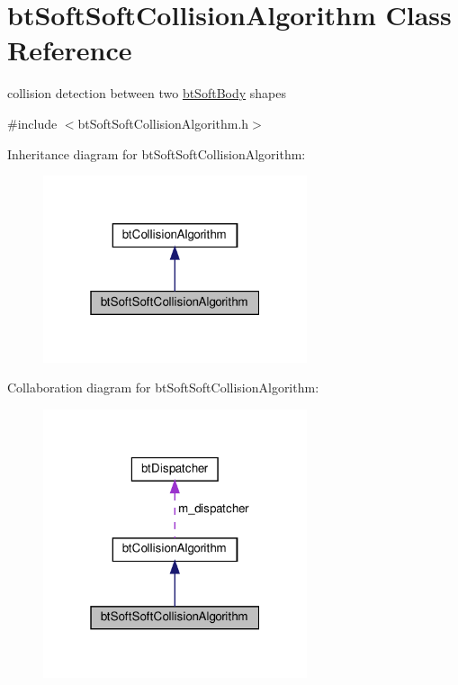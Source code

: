 \hypertarget{classbtSoftSoftCollisionAlgorithm}{}\section{bt\+Soft\+Soft\+Collision\+Algorithm Class Reference}
\label{classbtSoftSoftCollisionAlgorithm}


collision detection between two \hyperlink{classbtSoftBody}{bt\+Soft\+Body} shapes  




{\ttfamily \#include $<$bt\+Soft\+Soft\+Collision\+Algorithm.\+h$>$}



Inheritance diagram for bt\+Soft\+Soft\+Collision\+Algorithm\+:
\nopagebreak
\begin{figure}[H]
\begin{center}
\leavevmode
\includegraphics[width=220pt]{classbtSoftSoftCollisionAlgorithm__inherit__graph}
\end{center}
\end{figure}


Collaboration diagram for bt\+Soft\+Soft\+Collision\+Algorithm\+:
\nopagebreak
\begin{figure}[H]
\begin{center}
\leavevmode
\includegraphics[width=220pt]{classbtSoftSoftCollisionAlgorithm__coll__graph}
\end{center}
\end{figure}

